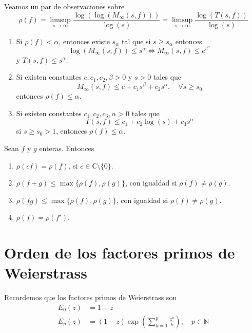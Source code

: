 \begin{remark}
    Veamos un par de observaciones sobre
    $$\rho(f) = \limsup_{s \to \infty} \frac{\log(\log(M_\infty(s, f)))}{\log(s)} = \limsup_{s \to \infty} \frac{\log(T(s, f))}{\log(s)}$$
    \begin{enumerate}
        \item Si $\rho(f) < \alpha$, entonces existe $s_\alpha$ tal que si $s \geq s_\alpha$ entonces
              $$\log(M_\infty(s, f)) \leq s^\alpha \Leftrightarrow M_\infty(s, f) \leq e^{s^\alpha}$$
              y $T(s, f) \leq s^\alpha$.

        \item Si existen constantes $c, c_1, c_2, \beta > 0$ y $s > 0$ tales que
              $$M_\infty(s, f) \leq c + c_1s^\beta + c_2s^\alpha, \quad \forall s \geq s_0$$
              entonces $\rho(f) \leq \alpha$.

        \item Si existen constantes $c_1, c_2, c_3, \alpha > 0$ tales que
              $$T(s, f) \leq c_1 + c_2\log(s) + c_3s^\alpha$$
              si $s \geq s_0 > 1$, entonces $\rho(f) \leq \alpha$.
    \end{enumerate}
\end{remark}

\begin{theorem}
    Sean $f$ y $g$ enteras.
    Entonces
    \begin{enumerate}
        \item $\rho(cf) = \rho(f)$, si $c \in \mathbb{C} \setminus \{0\}$.
        \item $\rho(f+g) \leq \max\{\rho(f), \rho(g)\}$, con igualdad si $\rho(f) \neq \rho(g)$.
        \item $\rho(fg) \leq \max\{\rho(f), \rho(g)\}$, con igualdad si $\rho(f) \neq \rho(g)$.
        \item $\rho(f) = \rho(f')$.
    \end{enumerate}
\end{theorem}


\section{Orden de los factores primos de Weierstrass}
Recordemos que los factores primos de Weierstrass son
\begin{align*}
    E_0(z) & = 1-z                                                                      \\
    E_p(z) & = (1-z)\exp\left(\sum_{k=1}^p \frac{z^k}{k}\right), \quad p \in \mathbb{N}
\end{align*}

